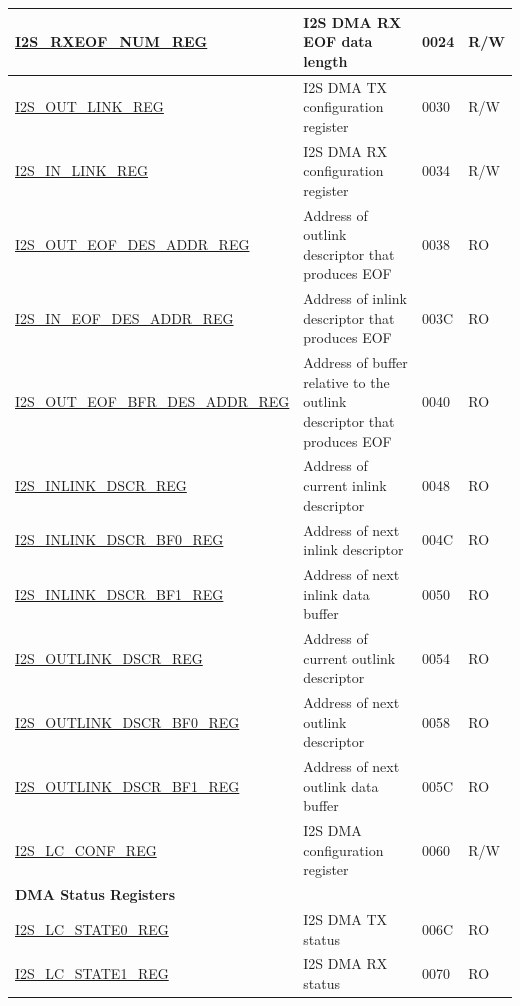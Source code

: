 \begin{longtable}{ | p{6cm} | p{7.2cm} | p{1.3cm} | p{1cm} | }
\hyperref[regdesc:I2SRXEOFNUMREG]{I2S\_RXEOF\_NUM\_REG} & I2S DMA RX EOF data length & \hexprefix{}0024 & R/W \\ \hline
\hyperref[regdesc:I2SOUTLINKREG]{I2S\_OUT\_LINK\_REG} & I2S DMA TX configuration register & \hexprefix{}0030 & R/W \\ \hline
\hyperref[regdesc:I2SINLINKREG]{I2S\_IN\_LINK\_REG} & I2S DMA RX configuration register & \hexprefix{}0034 & R/W \\ \hline
\hyperref[regdesc:I2SOUTEOFDESADDRREG]{I2S\_OUT\_EOF\_DES\_ADDR\_REG} & Address of outlink descriptor that produces EOF & \hexprefix{}0038 & RO \\ \hline
\hyperref[regdesc:I2SINEOFDESADDRREG]{I2S\_IN\_EOF\_DES\_ADDR\_REG} & Address of inlink descriptor that produces EOF & \hexprefix{}003C & RO \\ \hline
\hyperref[regdesc:I2SOUTEOFBFRDESADDRREG]{I2S\_OUT\_EOF\_BFR\_DES\_ADDR\_REG} & Address of buffer relative to the outlink descriptor that produces EOF & \hexprefix{}0040 & RO \\ \hline
\hyperref[regdesc:I2SINLINKDSCRREG]{I2S\_INLINK\_DSCR\_REG} & Address of current inlink descriptor & \hexprefix{}0048 & RO \\ \hline
\hyperref[regdesc:I2SINLINKDSCRBF0REG]{I2S\_INLINK\_DSCR\_BF0\_REG} & Address of next inlink descriptor & \hexprefix{}004C & RO \\ \hline
\hyperref[regdesc:I2SINLINKDSCRBF1REG]{I2S\_INLINK\_DSCR\_BF1\_REG} & Address of next inlink data buffer & \hexprefix{}0050 & RO \\ \hline
\hyperref[regdesc:I2SOUTLINKDSCRREG]{I2S\_OUTLINK\_DSCR\_REG} & Address of current outlink descriptor & \hexprefix{}0054 & RO \\ \hline
\hyperref[regdesc:I2SOUTLINKDSCRBF0REG]{I2S\_OUTLINK\_DSCR\_BF0\_REG} & Address of next outlink descriptor & \hexprefix{}0058 & RO \\ \hline
\hyperref[regdesc:I2SOUTLINKDSCRBF1REG]{I2S\_OUTLINK\_DSCR\_BF1\_REG} & Address of next outlink data buffer & \hexprefix{}005C & RO \\ \hline
\hyperref[regdesc:I2SLCCONFREG]{I2S\_LC\_CONF\_REG} & I2S DMA configuration register & \hexprefix{}0060 & R/W \\ \hline
\multicolumn{4}{|l|}{\textbf{DMA Status Registers}} \\ \hline
\hyperref[regdesc:I2SLCSTATE0REG]{I2S\_LC\_STATE0\_REG} & I2S DMA TX status & \hexprefix{}006C & RO \\ \hline
\hyperref[regdesc:I2SLCSTATE1REG]{I2S\_LC\_STATE1\_REG} & I2S DMA RX status & \hexprefix{}0070 & RO \\ \hline

\end{longtable}
